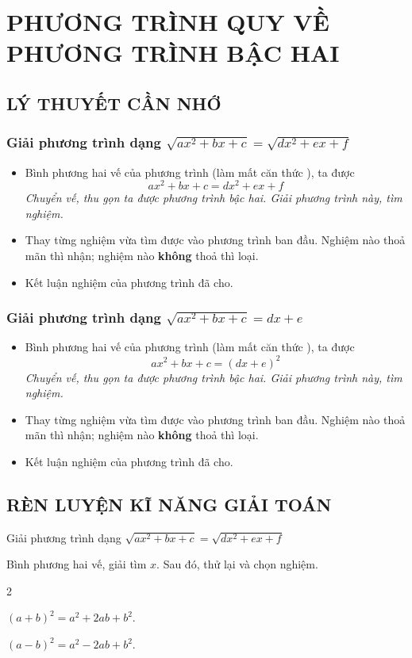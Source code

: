 \section{PHƯƠNG TRÌNH QUY VỀ PHƯƠNG TRÌNH BẬC HAI}

\subsection{LÝ THUYẾT CẦN NHỚ}
\subsubsection{Giải phương trình dạng $\sqrt{ax^2+bx+c}=\sqrt{dx^2+ex+f}$}
\begin{itemize}
	\item [$\bullet$] Bình phương hai vế của phương trình (làm mất căn thức ), ta được
	$$ax^2+bx+c=dx^2+ex+f$$
	\textit{Chuyển vế, thu gọn ta được phương trình bậc hai. Giải phương trình này, tìm nghiệm.}
	\item [$\bullet$] Thay từng nghiệm vừa tìm được vào phương trình ban đầu. Nghiệm nào thoả mãn thì nhận; nghiệm nào \textbf{không} thoả thì loại.
	\item [$\bullet$] Kết luận nghiệm của phương trình đã cho.
\end{itemize}
\subsubsection{Giải phương trình dạng $\sqrt{ax^2+bx+c}=dx+e$}
\begin{itemize}
	\item [$\bullet$] Bình phương hai vế của phương trình (làm mất căn thức ), ta được
	$$ax^2+bx+c=(dx+e)^2$$
	\textit{Chuyển vế, thu gọn ta được phương trình bậc hai. Giải phương trình này, tìm nghiệm.}
	\item [$\bullet$] Thay từng nghiệm vừa tìm được vào phương trình ban đầu. Nghiệm nào thoả mãn thì nhận; nghiệm nào \textbf{không} thoả thì loại.
	\item [$\bullet$] Kết luận nghiệm của phương trình đã cho.
\end{itemize}

\subsection{RÈN LUYỆN KĨ NĂNG GIẢI TOÁN}
\begin{dang}{Giải phương trình dạng $\sqrt{ax^2+bx+c}=\sqrt{dx^2+ex+f}$}
\begin{listEX}[1]
	\item [\ding{172}]  Bình phương hai vế, giải tìm $x$. Sau đó, thử lại và chọn nghiệm.
	\item [\ding{173}]  
	\begin{enumEX}[$\bullet$]{2}
		\item $(a+b)^2=a^2+2ab+b^2$.
		\item $(a-b)^2=a^2-2ab+b^2$.
	\end{enumEX}
\end{listEX}
\end{dang}

